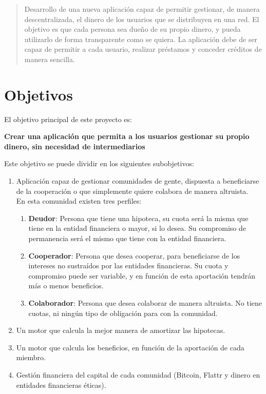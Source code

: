 \documentclass[10pt]{article}
\begin{document}
\title{}
\author{Diego Pardilla}
\date{\today}


\maketitle

\begin{abstract}
Desarrollo de una nueva aplicación capaz de permitir gestionar, de manera descentralizada, el dinero de los usuarios que se distribuyen en una red. El objetivo es que cada persona sea dueño de su propio dinero, y pueda utilizarlo de forma transparente como se quiera. La aplicación debe de ser capaz de permitir a cada usuario, realizar préstamos y conceder créditos de manera sencilla.   
\end{abstract}

\section{Objetivos}

El objetivo principal de este proyecto es:

\begin{center}
\bf{Crear una aplicación que permita a los usuarios gestionar su propio dinero, sin necesidad de intermediarios}
\end{center}

Este objetivo se puede dividir en los siguientes subobjetivos:

\begin{enumerate}
  \item Aplicación capaz de gestionar comunidades de gente, dispuesta a beneficiarse de la cooperación o que simplemente quiere colabora de manera altruista.\\ 
En esta comunidad existen tres perfiles:
\begin{enumerate}
\item \textbf{Deudor}: Persona que tiene una hipoteca, su cuota será la misma que tiene en la entidad financiera o mayor, si lo desea. Su compromiso de permanencia será el mismo que tiene con la entidad financiera.
\item \textbf{Cooperador}: Persona que desea cooperar, para beneficiarse de los intereses no sustraídos por las entidades financieras. Su cuota y compromiso puede ser variable, y en función de esta aportación tendrán más o menos beneficios.
\item \textbf{Colaborador}: Persona que desea colaborar de manera altruista. No tiene cuotas, ni ningún tipo de obligación para con la comunidad.
\end{enumerate}
  \item Un motor que calcula la mejor manera de amortizar las hipotecas.
  \item Un motor que calcula los beneficios, en función de la aportación de cada miembro.
  \item Gestión financiera del capital de cada comunidad (Bitcoin, Flattr y dinero en entidades financieras éticas).
\end{enumerate}
\end{document}
